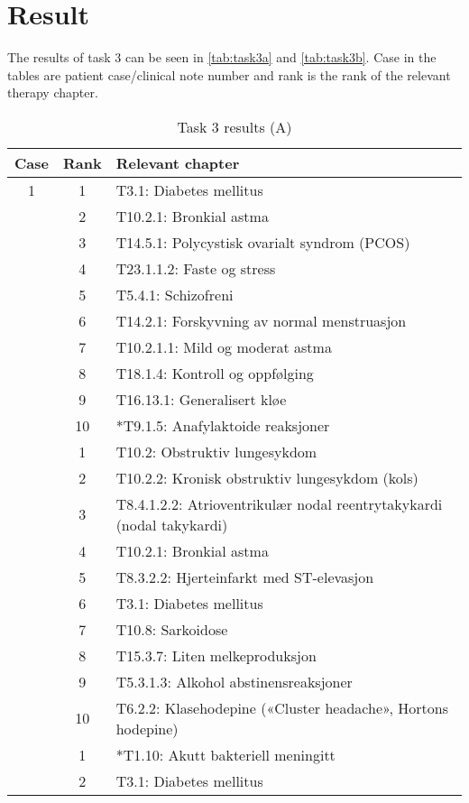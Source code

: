 \documentclass[a4paper, 11pt]{article}
\begin{document}
\section{Result}
\label{sec:result}
The results of task 3 can be seen in \autoref{tab:task3a} and
\autoref{tab:task3b}. Case in the tables are patient case/clinical note
number and rank is the rank of the relevant therapy chapter.
\begin{table}[htbp] \footnotesize \center
\caption{Task 3 results (A)\label{tab:task3a}}
\begin{tabular}{c c l}
    \toprule
    Case & Rank & Relevant chapter \\
    \midrule
	1 & 1 & T3.1: Diabetes mellitus \\
	 & 2 & T10.2.1: Bronkial astma \\
	 & 3 & T14.5.1: Polycystisk ovarialt syndrom (PCOS) \\
	 & 4 & T23.1.1.2: Faste og stress \\
	 & 5 & T5.4.1: Schizofreni \\
	 & 6 & T14.2.1: Forskyvning av normal menstruasjon \\
	 & 7 & T10.2.1.1: Mild og moderat astma \\
	 & 8 & T18.1.4: Kontroll og oppfølging \\
	 & 9 & T16.13.1: Generalisert kløe \\
	 & 10 & *T9.1.5: Anafylaktoide reaksjoner \\
	\addlinespace
	2 & 1 & T10.2: Obstruktiv lungesykdom \\
	 & 2 & T10.2.2: Kronisk obstruktiv lungesykdom (kols) \\
	 & 3 & T8.4.1.2.2: Atrioventrikulær nodal reentrytakykardi (nodal takykardi) \\
	 & 4 & T10.2.1: Bronkial astma \\
	 & 5 & T8.3.2.2: Hjerteinfarkt med ST-elevasjon \\
	 & 6 & T3.1: Diabetes mellitus \\
	 & 7 & T10.8: Sarkoidose \\
	 & 8 & T15.3.7: Liten melkeproduksjon \\
	 & 9 & T5.3.1.3: Alkohol abstinensreaksjoner \\
	 & 10 & T6.2.2: Klasehodepine («Cluster headache», Hortons hodepine) \\
	\addlinespace
	3 & 1 & *T1.10: Akutt bakteriell meningitt \\
	 & 2 & T3.1: Diabetes mellitus \\

\end{tabular}
\end{table}
\end{document}
